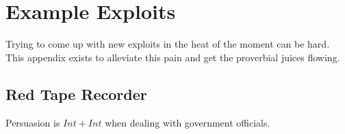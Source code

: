 \chapter{Example Exploits}
Trying to come up with new exploits in the heat of the moment can be hard.
This appendix exists to alleviate this pain and get the proverbial juices flowing.

\section{Red Tape Recorder}
Persuasion is $Int + Int$ when dealing with government officials.